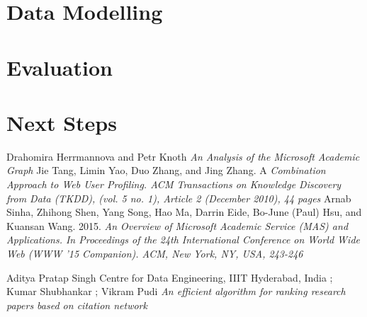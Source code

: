 \documentclass[a4paper, 11pt]{article}
\begin{document}
\section*{Data Modelling}




\section*{Evaluation}


\section*{Next Steps}




\begin{thebibliography}{9}
Drahomira Herrmannova and Petr Knoth \emph{An Analysis of the Microsoft Academic Graph
}
Jie Tang, Limin Yao, Duo Zhang, and Jing Zhang. A \emph{ Combination Approach to Web User Profiling. ACM Transactions on Knowledge Discovery from Data (TKDD), (vol. 5 no. 1), Article 2 (December 2010), 44 pages}
Arnab Sinha, Zhihong Shen, Yang Song, Hao Ma, Darrin Eide, Bo-June (Paul) Hsu, and Kuansan Wang. 2015. \emph{An Overview of Microsoft Academic Service (MAS) and Applications. In Proceedings of the 24th International Conference on World Wide Web (WWW ’15 Companion). ACM, New York, NY, USA, 243-246}

Aditya Pratap Singh 
Centre for Data Engineering, IIIT Hyderabad, India
; Kumar Shubhankar ; Vikram Pudi \emph{An efficient algorithm for ranking research papers based on citation network
}

\end{thebibliography}
\end{document}
